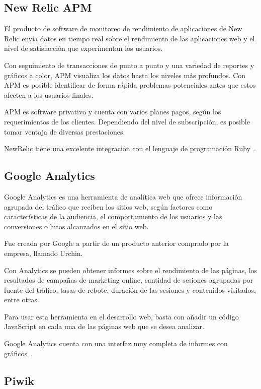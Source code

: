 \subsection{New Relic APM}

El producto de software de monitoreo de rendimiento de aplicaciones de New
Relic envía datos en tiempo real sobre el rendimiento de las aplicaciones web y
el nivel de satisfacción que experimentan los usuarios.

Con seguimiento de transacciones de punto a punto y una variedad de reportes y
gráficos a color, APM visualiza los datos hasta los niveles más profundos. Con
APM es posible identificar de forma rápida problemas potenciales antes que
estos afecten a los usuarios finales.

APM es software privativo y cuenta con varios planes pagos, según los
requerimientos de los clientes. Dependiendo del nivel de subscripción, es
posible tomar ventaja de diversas prestaciones.

NewRelic tiene una excelente integración con el lenguaje de programación
Ruby~\cite{newrelic}.

\subsection{Google Analytics}

Google Analytics es una herramienta de analítica web que ofrece información
agrupada del tráfico que reciben los sitios web, según factores como
características de la audiencia, el comportamiento de los usuarios y las
conversiones o hitos alcanzados en el sitio web.

Fue creada por Google a partir de un producto anterior comprado por la empresa,
llamado Urchin.

Con Analytics se pueden obtener informes sobre el rendimiento de las páginas,
los resultados de campañas de marketing online, cantidad de sesiones agrupadas
por fuente del tráfico, tasas de rebote, duración de las sesiones y contenidos
visitados, entre otras.

Para usar esta herramienta en el desarrollo web, basta con añadir un código
JavaScript en cada una de las páginas web que se desea analizar.

Google Analytics cuenta con una interfaz muy completa de informes con
gráficos~\cite{analytics}.

\subsection{Piwik}


